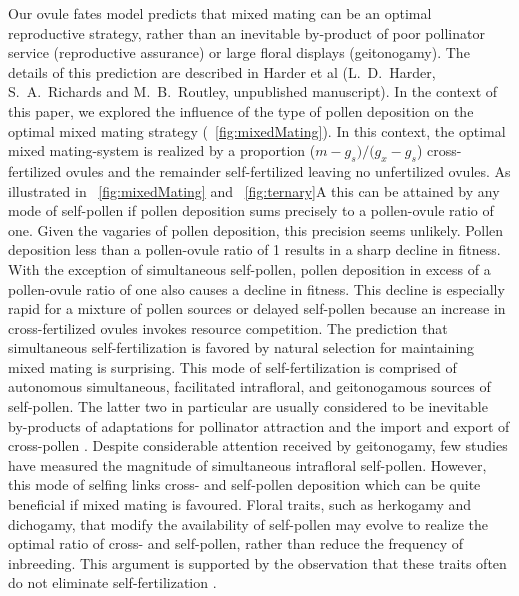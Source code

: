 \documentclass[letterpaper,titlepage]{scrartcl}
\newcommand{\OFMixedMating}{L.~D.~Harder, S.~A.~Richards and
  M.~B.~Routley, unpublished manuscript}
\begin{document}
Our ovule fates model predicts that mixed mating can be an optimal
reproductive strategy, rather than an inevitable by-product of poor
pollinator service (reproductive assurance) or large floral displays
(geitonogamy). The details of this prediction are described in Harder
et al ({\OFMixedMating}). In the context of this paper, we explored
the influence of the type of pollen deposition on the optimal mixed
mating strategy ({\fref}~\ref{fig:mixedMating}). In this context, the
optimal mixed mating-system is realized by a proportion ($m-g_{s})/(
g_{x}-g_{s}$) cross-fertilized ovules and the remainder
self-fertilized leaving no unfertilized ovules. As illustrated in
{\fref}~\ref{fig:mixedMating} and {\fref}~\ref{fig:ternary}A this can
be attained by any mode of self-pollen if pollen deposition sums
precisely to a pollen-ovule ratio of one. Given the vagaries of pollen
deposition, this precision seems unlikely. Pollen deposition less than
a pollen-ovule ratio of 1 results in a sharp decline in fitness. With
the exception of simultaneous self-pollen, pollen deposition in excess
of a pollen-ovule ratio of one also causes a decline in fitness. This
decline is especially rapid for a mixture of pollen sources or delayed
self-pollen because an increase in cross-fertilized ovules invokes
resource competition. The prediction that simultaneous
self-fertilization is favored by natural selection for maintaining
mixed mating is surprising. This mode of self-fertilization is
comprised of autonomous simultaneous, facilitated intrafloral, and
geitonogamous sources of self-pollen. The latter two in particular are
usually considered to be inevitable by-products of adaptations for
pollinator attraction and the import and export of cross-pollen
\citep{Lloyd92}. Despite considerable attention received by
geitonogamy, few studies have measured the magnitude of simultaneous
intrafloral self-pollen. However, this mode of selfing links cross-
and self-pollen deposition which can be quite beneficial if mixed
mating is favoured. Floral traits, such as herkogamy and dichogamy,
that modify the availability of self-pollen may evolve to realize the
optimal ratio of cross- and self-pollen, rather than reduce the
frequency of inbreeding. This argument is supported by the observation
that these traits often do not eliminate self-fertilization
\citetext{e.g., \citealp{Griffin00}}.
\end{document}

